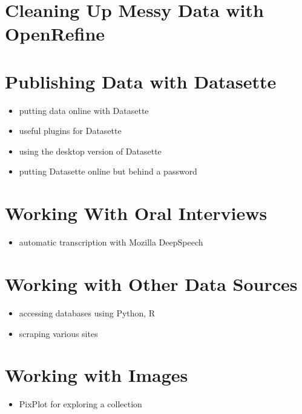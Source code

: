 \documentclass[
]{book}
\providecommand{\tightlist}{%
  \setlength{\itemsep}{0pt}\setlength{\parskip}{0pt}}
\begin{document}
\hypertarget{open-refine}{%
\section{Cleaning Up Messy Data with OpenRefine}\label{open-refine}}

\hypertarget{publishing}{%
\section{Publishing Data with Datasette}\label{publishing}}

\begin{itemize}
\tightlist
\item
  putting data online with Datasette
\item
  useful plugins for Datasette
\item
  using the desktop version of Datasette
\item
  putting Datasette online but behind a password
\end{itemize}

\hypertarget{oral-interviews}{%
\section{Working With Oral Interviews}\label{oral-interviews}}

\begin{itemize}
\tightlist
\item
  automatic transcription with Mozilla DeepSpeech
\end{itemize}

\hypertarget{open-data}{%
\section{Working with Other Data Sources}\label{open-data}}

\begin{itemize}
\tightlist
\item
  accessing databases using Python, R
\item
  scraping various sites
\end{itemize}

\hypertarget{images}{%
\section{Working with Images}\label{images}}

\begin{itemize}
\tightlist
\item
  PixPlot for exploring a collection
\end{itemize}
\end{document}
